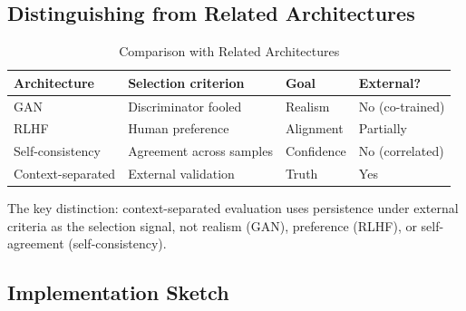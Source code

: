 \documentclass[11pt]{article}
\begin{document}
\subsection{Distinguishing from Related Architectures}

\begin{table}[h]
\centering
\caption{Comparison with Related Architectures}
\begin{tabular}{llll}
\toprule
\textbf{Architecture} & \textbf{Selection criterion} & \textbf{Goal} & \textbf{External?} \\
\midrule
GAN & Discriminator fooled & Realism & No (co-trained) \\
RLHF & Human preference & Alignment & Partially \\
Self-consistency & Agreement across samples & Confidence & No (correlated) \\
Context-separated & External validation & Truth & Yes \\
\bottomrule
\end{tabular}
\end{table}

The key distinction: context-separated evaluation uses persistence under external criteria
as the selection signal, not realism (GAN), preference (RLHF), or self-agreement
(self-consistency).

\subsection{Implementation Sketch}
\end{document}
